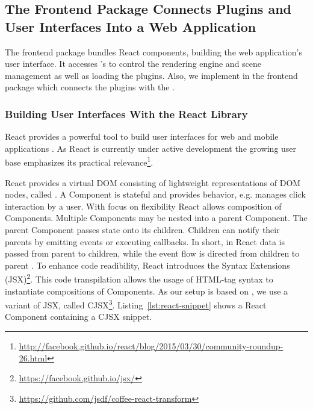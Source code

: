 \documentclass[../../ClassicThesis.tex]{subfiles}
\begin{document}
\subsection{The Frontend Package Connects Plugins and User Interfaces
  Into a Web Application}
\label{sec:client-to-application}





The frontend package bundles React components, building the web
application's user interface. It accesses {\convertify}'s
 to control the rendering engine and scene
management as well as loading the plugins. Also, we implement
 in the frontend package which connects the plugins
with the {\userinterface}.

\subsubsection{Building User Interfaces With the React Library}
\label{sec:ui-with-react}

React provides a powerful tool to build user interfaces for web and
mobile applications \cite{React13}. As React is currently under active
development the growing user base emphasizes its practical
relevance\footnote{\url{http://facebook.github.io/react/blog/2015/03/30/community-roundup-26.html}}.

React provides a virtual DOM consisting of lightweight representations
of DOM nodes, called  \cite{React13}. A Component is
stateful and provides behavior, e.g. manages click interaction by a
user. With focus on flexibility React allows composition of
Components. Multiple Components may be nested into a parent Component.
The parent Component passes state onto its children. Children can
notify their parents by emitting events or executing callbacks. In
short, in React data is passed from parent to children, while the
event flow is directed from children to parent
\cite{ReactDocComponents}. To enhance code readibility, React
introduces the {\javascript} Syntax Extensions
(JSX)\footnote{\url{https://facebook.github.io/jsx/}}. This code
transpilation allows the usage of HTML-tag syntax to instantiate
compositions of Components. As our setup is based on {\coffeescript},
we use a {\coffeescript} variant of JSX, called
CJSX\footnote{\url{https://github.com/jsdf/coffee-react-transform}}.
Listing~\ref{lst:react-snippet} shows a React Component containing a CJSX
snippet.
\end{document}
